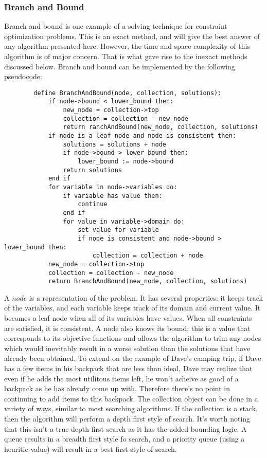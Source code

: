 \documentclass{article}
\begin{document}
    \subsubsection{Branch and Bound}
    Branch and bound is one example of a solving technique for constraint optimization problems. This is an exact method, and will give the 
    best answer of any algorithm presented here. However, the time and space complexity of this algorithm is of major concern. That is what
    gave rise to the inexact methods discussed below. Branch and bound can be implemented by the following pseudocode:
    \begin{lstlisting}
        define BranchAndBound(node, collection, solutions):
            if node->bound < lower_bound then:
                new_node = collection->top
                collection = collection - new_node
                return ranchAndBound(new_node, collection, solutions)
            if node is a leaf node and node is consistent then:
                solutions = solutions + node
                if node->bound > lower_bound then:
                    lower_bound := node->bound
                return solutions
            end if
            for variable in node->variables do:
                if variable has value then:
                    continue
                end if
                for value in variable->domain do:
                    set value for variable
                    if node is consistent and node->bound > lower_bound then:
                        collection = collection + node
            new_node = collection->top
            collection = collection - new_node
            return BranchAndBound(new_node, collection, solutions)
    \end{lstlisting}
    A \(node\) is a representation of the problem. It has several properties: it keeps track of the variables, and each variable keeps track of its 
    domain and current value. It becomes a leaf node when all of its variables have values. When all constraints are satisfied, it is consistent.
    A node also knows its bound; this is a value that corresponds to its objective functions and allows the algorithm to 
    trim any nodes which would inevitably result in a worse solution than the solutions that have already been obtained. To extend on the example 
    of Dave's camping trip, if Dave has a few items in his backpack that are less than ideal, Dave may realize that even if he adds the most 
    utilitous items left, he won't acheive as good of a backpack as he has already come up with. Therefore there's no point in continuing to add 
    items to this backpack. The collection object can be done in a variety of ways, similar to most searching algorithms. If the collection is 
    a stack, then the algorithm will perform a depth first style of search. It's worth noting that this isn't a true depth first search as it has the
    added bounding logic. A queue results in a breadth first style fo search, and a priority queue (using a heuritic value) will result in a
    best first style of search. \cite{LandDoig} \cite{Apt} \cite{Dechter}
\end{document}
